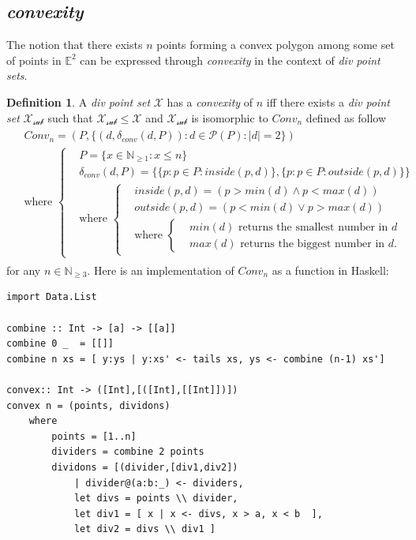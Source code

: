 \documentclass[11pt, oneside]{article}      %
\theoremstyle{definition}
\newtheorem{defn}{Definition}
\numberwithin{equation}{section}
\theoremstyle{c}
\begin{document}
\subsection{\textit{convexity}}
The notion that there exists $n$ points forming a convex polygon among some set of points in $\mathbb{E}^2$ can be expressed through \textit{convexity} in the context of \textit{div point sets}.
\begin{defn}
A \textit{div point set} $\mathscr{X}$ has a \textit{convexity} of $n$ iff there exists a \textit{div point set} $\mathscr{X_{sub}}$ such that $\mathscr{X_{sub}}  \leq \mathscr{X} $ and $\mathscr{X_{sub}}$ is isomorphic to $Conv_n$ defined as follow
\begin{align}
\begin{split}\label{conv}
     & Conv_n  = (P,  \{ (d,\delta_{conv}(d,P))  : d \in \mathcal{P}(P) : |d| = 2\}) \\
     &\text{where }
     \begin{cases}
     &P = \{ x \in \mathbb{N}_{\geq 1} : x \leq n \} \\
    &\delta_{conv}(d,P) = \{ \{  p : p \in P : inside(p,d) \}, \{  p : p \in P : outside(p,d) \}\} \\
    &\text{where }
     \begin{cases}
    & inside(p,d) = ( p > min(d) \land p < max(d) ) \\
    & outside(p,d) = ( p < min(d) \lor p > max(d) ) \\
     &\text{where }
     \begin{cases}
    &\text{$min(d)$ returns the smallest number in $d$} \\
    &\text{$max(d)$ returns the biggest number in $d$}.
    \end{cases}
     \end{cases}
     \end{cases}
  \end{split}
  \end{align}
for any $n \in \mathbb{N}_{\geq 3}$. Here is an implementation of $Conv_n$ as a function in Haskell:
\begin{lstlisting}
import Data.List

combine :: Int -> [a] -> [[a]]
combine 0 _  = [[]]
combine n xs = [ y:ys | y:xs' <- tails xs, ys <- combine (n-1) xs']

convex:: Int -> ([Int],[([Int],[[Int]])])
convex n = (points, dividons)
    where
        points = [1..n]
        dividers = combine 2 points
        dividons = [(divider,[div1,div2])
            | divider@(a:b:_) <- dividers,
            let divs = points \\ divider,
            let div1 = [ x | x <- divs, x > a, x < b  ],
            let div2 = divs \\ div1 ]
\end{lstlisting}
\end{defn}
\end{document}

